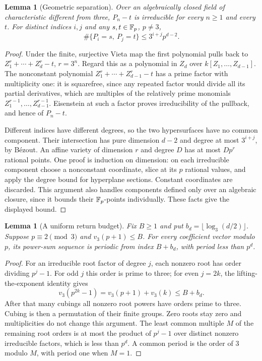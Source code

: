\documentclass[11pt,a4paper]{article}
\newtheorem{lemma}[theorem]{Lemma}
\theoremstyle{remark}\newtheorem{remark}[theorem]{Remark}
\begin{document}
\begin{lemma}[Geometric separation]\label{lem:shiftedgeometry}
Over an algebraically closed field of characteristic different from
three, $P_n-t$ is irreducible for every $n\ge1$ and every $t$.
For distinct indices $i,j$ and any $s,t\in\mathbb F_p$, $p\ne3$,
\[
 \#\{P_i=s,\ P_j=t\}\le 3^{i+j}p^{d-2}.
\]
\end{lemma}
\begin{proof}
Under the finite, surjective Vieta map the first polynomial pulls
back to $Z_1^r+\cdots+Z_d^r-t$, $r=3^n$. Regard this as a polynomial
in $Z_d$ over $k[Z_1,\ldots,Z_{d-1}]$. The nonconstant polynomial
$Z_1^r+\cdots+Z_{d-1}^r-t$ has a prime factor with multiplicity one:
it is squarefree, since any repeated factor would divide all its
partial derivatives, which are multiples of the relatively prime
monomials $Z_1^{r-1},\ldots,Z_{d-1}^{r-1}$. Eisenstein at such a
factor proves irreducibility of the pullback, and hence of $P_n-t$.

Different indices have different degrees, so the two hypersurfaces
have no common component. Their intersection has pure dimension
$d-2$ and degree at most $3^{i+j}$, by B\'ezout. An affine variety of
dimension $r$ and degree $D$ has at most $Dp^r$ rational points.
One proof is induction on dimension: on each irreducible component
choose a nonconstant coordinate, slice at its $p$ rational values,
and apply the degree bound for hyperplane sections. Constant
coordinates are discarded. This argument also handles components
defined only over an algebraic closure, since it bounds their
$\mathbb F_p$-points individually. These facts give the displayed bound.
\end{proof}

\begin{lemma}[A uniform return budget]\label{lem:returnbudget}
Fix $B\ge1$ and put $b_d=\lfloor\log_3(d/2)\rfloor$.
Suppose $p\equiv2\pmod3$ and $v_3(p+1)\le B$. For every coefficient
vector modulo $p$, its power-sum sequence is periodic from index
$B+b_d$, with period less than $p^d$.
\end{lemma}
\begin{proof}
For an irreducible root factor of degree $j$, each nonzero root has
order dividing $p^j-1$. For odd $j$ this order is prime to three;
for even $j=2k$, the lifting-the-exponent identity gives
\[
 v_3(p^{2k}-1)=v_3(p+1)+v_3(k)\le B+b_d.
\]
After that many cubings all nonzero root powers have orders prime
to three. Cubing is then a permutation of their finite groups.
Zero roots stay zero and multiplicities do not change this argument.
The least common multiple $M$ of the remaining root orders is at
most the product of $p^j-1$ over distinct nonzero irreducible factors,
which is less than $p^d$. A common period is the order of $3$ modulo
$M$, with period one when $M=1$.
\end{proof}
\end{document}
